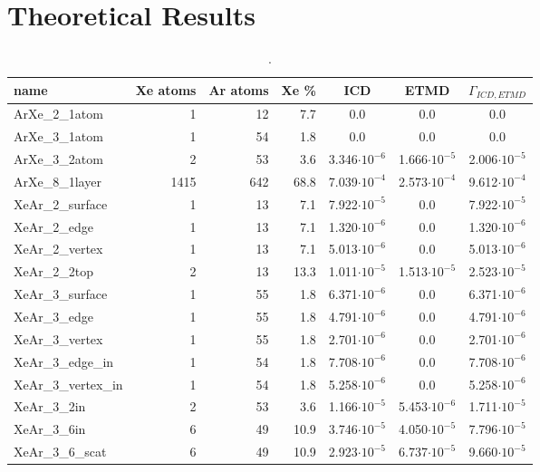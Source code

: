 \section{Theoretical Results}


\begin{table}
\centering
\caption{.}
\begin{tabular}{lrrrccc}
\toprule
name                 & Xe atoms & Ar atoms & Xe \% &   ICD                &  ETMD                & $\Gamma_{ICD,ETMD}$\\
\midrule
ArXe\_2\_1atom       &      1   &     12   &  7.7  &      0.0             &  0.0                 &     0.0            \\
ArXe\_3\_1atom       &      1   &     54   &  1.8  &      0.0             &  0.0                 &     0.0            \\ 
ArXe\_3\_2atom       &      2   &     53   &  3.6  & 3.346$\cdot 10^{-6}$ & 1.666$\cdot 10^{-5}$ & 2.006$\cdot 10^{-5}$ \\
ArXe\_8\_1layer      &   1415   &    642   & 68.8  & 7.039$\cdot 10^{-4}$ & 2.573$\cdot 10^{-4}$ & 9.612$\cdot 10^{-4}$ \\
XeAr\_2\_surface     &      1   &     13   &  7.1  & 7.922$\cdot 10^{-5}$ & 0.0                  & 7.922$\cdot 10^{-5}$ \\
XeAr\_2\_edge        &      1   &     13   &  7.1  & 1.320$\cdot 10^{-6}$ & 0.0                  & 1.320$\cdot 10^{-6}$ \\
XeAr\_2\_vertex      &      1   &     13   &  7.1  & 5.013$\cdot 10^{-6}$ & 0.0                  & 5.013$\cdot 10^{-6}$ \\
XeAr\_2\_2top        &      2   &     13   & 13.3  & 1.011$\cdot 10^{-5}$ & 1.513$\cdot 10^{-5}$ & 2.523$\cdot 10^{-5}$ \\
XeAr\_3\_surface     &      1   &     55   &  1.8  & 6.371$\cdot 10^{-6}$ & 0.0                  & 6.371$\cdot 10^{-6}$ \\
XeAr\_3\_edge        &      1   &     55   &  1.8  & 4.791$\cdot 10^{-6}$ & 0.0                  & 4.791$\cdot 10^{-6}$ \\
XeAr\_3\_vertex      &      1   &     55   &  1.8  & 2.701$\cdot 10^{-6}$ & 0.0                  & 2.701$\cdot 10^{-6}$ \\
XeAr\_3\_edge\_in    &      1   &     54   &  1.8  & 7.708$\cdot 10^{-6}$ & 0.0                  & 7.708$\cdot 10^{-6}$ \\
XeAr\_3\_vertex\_in  &      1   &     54   &  1.8  & 5.258$\cdot 10^{-6}$ & 0.0                  & 5.258$\cdot 10^{-6}$ \\
XeAr\_3\_2in         &      2   &     53   &  3.6  & 1.166$\cdot 10^{-5}$ & 5.453$\cdot 10^{-6}$ & 1.711$\cdot 10^{-5}$ \\
XeAr\_3\_6in         &      6   &     49   & 10.9  & 3.746$\cdot 10^{-5}$ & 4.050$\cdot 10^{-5}$ & 7.796$\cdot 10^{-5}$ \\
XeAr\_3\_6\_scat     &      6   &     49   & 10.9  & 2.923$\cdot 10^{-5}$ & 6.737$\cdot 10^{-5}$ & 9.660$\cdot 10^{-5}$ \\
\bottomrule
\end{tabular}
\label{table:theo_gammas}
\end{table}
